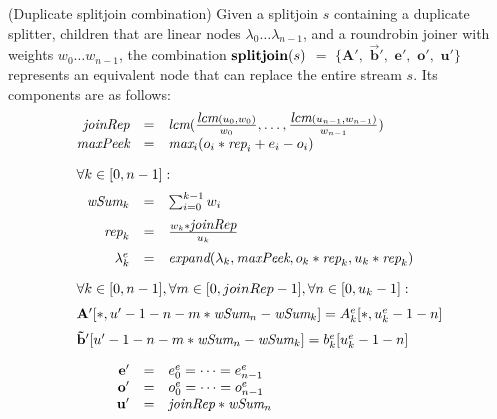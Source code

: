 \begin{transformation} (Duplicate splitjoin combination)
Given a splitjoin $s$ containing a duplicate splitter, children that
are linear nodes $\lambda_0 \dots \lambda_{n-1}$, and a roundrobin
joiner with weights $w_0 \dots w_{n-1}$, the combination $\mbox{\bf
splitjoin}(s)$ $=$ $\mathbf{ \{A',}$ $\mathbf{{\vec b}',}$ $\mathbf{e',}$
$\mathbf{o',}$ $\mathbf{u'\}}$ represents an equivalent node that can
replace the entire stream $s$.  Its components are as follows:
\begin{equation} \nonumber
\begin{array}{rcl}
\mt{joinRep} & = & \mt{lcm}(\frac{\mt{lcm}(u_0,w_0)}{w_0}, \dots, \frac{\mt{lcm}(u_{n-1},w_{n-1})}{w_{n-1}}) \\
\mt{maxPeek} & = & \mt{max}_i (o_i * \mt{rep}_i + e_i - o_i) \\ ~ \vspace{-2pt} \\
\multicolumn{3}{l}{\forall k \in [0, n-1]:} \\ ~ \vspace{-6pt} \\
\mt{wSum}_k & = & \sum_{i=0}^{k-1} w_i \\ ~ \vspace{-6pt} \\
\mt{rep}_k & = & \frac{w_k * \mt{joinRep}}{u_k} \\ ~ \vspace{-6pt} \\
\lambda_k^e & = & \mt{expand}(\lambda_k, \mt{maxPeek}, 
                              o_k * \mt{rep}_k, u_k * \mt{rep}_k) \\ ~ \vspace{-2pt} \\
\multicolumn{3}{l}{\forall k \in [0, n-1], \forall m \in [0, joinRep-1], \forall n \in [0, u_k-1]:} \\ ~ \vspace{-6pt} \\
\multicolumn{3}{l}{\mathbf{A'}[*, u'-1-n - m * \mt{wSum}_{n}-\mt{wSum}_{k}] = 
  A_{k}^e [*,u_k^e-1-n]} \\ ~ \vspace{-6pt} \\
\multicolumn{3}{l}{\mathbf{{\vec b}'}[u'-1-n - m * \mt{wSum}_{n}-\mt{wSum}_{k}] = 
  b_{k}^e [u_k^e-1-n]} \\ ~ \vspace{-2pt} \\
\mathbf{e'} & = & e_0^e = \dots = e_{n-1}^e \\
\mathbf{o'} & = & o_0^e = \dots = o_{n-1}^e \\
\mathbf{u'} & = & \mt{joinRep} * \mt{wSum}_n \\
\end{array}
\end{equation}
\end{transformation}

